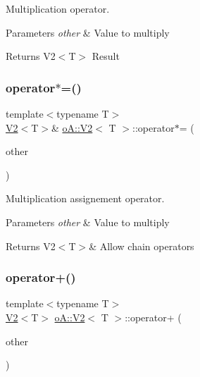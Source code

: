 Multiplication operator. 


\begin{DoxyParams}{Parameters}
{\em other} & Value to multiply \\
\hline
\end{DoxyParams}
\begin{DoxyReturn}{Returns}
V2$<$\+T$>$ Result 
\end{DoxyReturn}
\mbox{\label{structo_a_1_1_v2_ae618eb05f845b5a4219d198e33f79699}} 
\subsubsection{\texorpdfstring{operator$\ast$=()}{operator*=()}}
{\footnotesize\ttfamily template$<$typename T$>$ \\
\mbox{\hyperlink{structo_a_1_1_v2}{V2}}$<$T$>$\& \mbox{\hyperlink{structo_a_1_1_v2}{o\+A\+::\+V2}}$<$ T $>$\+::operator$\ast$= (\begin{DoxyParamCaption}\item[{const \mbox{\hyperlink{structo_a_1_1_v2}{o\+A\+::\+V2}}$<$ T $>$ \&}]{other }\end{DoxyParamCaption})\hspace{0.3cm}{\ttfamily [inline]}}



Multiplication assignement operator. 


\begin{DoxyParams}{Parameters}
{\em other} & Value to multiply \\
\hline
\end{DoxyParams}
\begin{DoxyReturn}{Returns}
V2$<$\+T$>$\& Allow chain operators 
\end{DoxyReturn}
\mbox{\label{structo_a_1_1_v2_a9b089bbe3ae2f0a2166a79eb240159ad}} 
\subsubsection{\texorpdfstring{operator+()}{operator+()}}
{\footnotesize\ttfamily template$<$typename T$>$ \\
\mbox{\hyperlink{structo_a_1_1_v2}{V2}}$<$T$>$ \mbox{\hyperlink{structo_a_1_1_v2}{o\+A\+::\+V2}}$<$ T $>$\+::operator+ (\begin{DoxyParamCaption}\item[{const \mbox{\hyperlink{structo_a_1_1_v2}{o\+A\+::\+V2}}$<$ T $>$ \&}]{other }\end{DoxyParamCaption})\hspace{0.3cm}{\ttfamily [inline]}}




